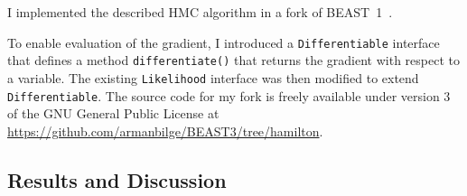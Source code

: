 \documentclass{article}
\begin{document}
    I implemented the described \ac{HMC} algorithm in a fork of
        BEAST~1~\cite{Dru+12}.

    To enable evaluation of the gradient, I introduced a
        \texttt{Differentiable} interface that defines a method
        \texttt{differentiate()} that returns the gradient with respect to a
        variable.
    The existing \texttt{Likelihood} interface was then modified to extend
        \texttt{Differentiable}.
    The source code for my fork is freely available under version 3 of the GNU
        General Public License at
        \url{https://github.com/armanbilge/BEAST3/tree/hamilton}.

    \subsection*{Results and Discussion}

    \printbibliography
\end{document}
